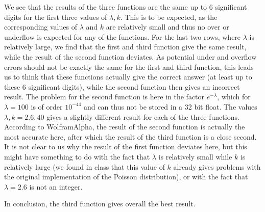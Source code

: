 We see that the results of the three functions are the same up to 6 significant digits for the first three values of $\lambda,k$.
This is to be expected, as the corresponding values of $\lambda$ and $k$ are relatively small and thus no over or underflow is expected for any of the functions.
For the last two rows, where $\lambda$ is relatively large, we find that the first and third function give the same result, while the result of the second function deviates.
As potential under and overflow errors should not be exactly the same for the first and third function, this leads us to think that
these functions actually give the correct answer (at least up to these 6 significant digits), while the second function then gives an incorrect result.
The problem for the second function is here in the factor $e^{-\lambda}$, which for $\lambda=100$ is of order $10^{-44}$ and can thus not be stored in a 32 bit float.
The values $\lambda,k=2.6,40$ gives a slightly different result for each of the three functions.
According to WolframAlpha, the result of the second function is actually the most accurate here, after which the result of the third function is a close second.
It is not clear to us why the result of the first function deviates here, but this might have something to do with the fact that $\lambda$ is relatively small while
$k$ is relatively large (we found in class that this value of $k$ already gives problems with the original implementation of the Poisson distribution), or with the fact that
$\lambda=2.6$ is not an integer.

In conclusion, the third function gives overall the best result.